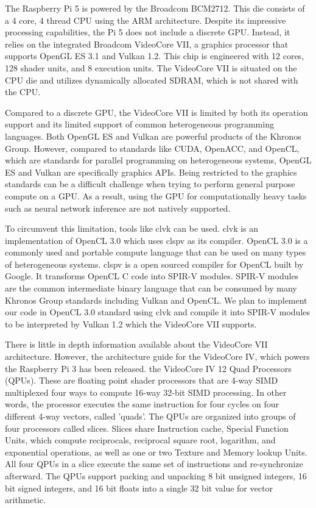 \documentclass[conference]{IEEEtran}
\begin{document}
 The Raspberry Pi 5 is powered by the Broadcom BCM2712. This die consists of a 
 4 core, 4 thread CPU using the ARM architecture. Despite its impressive processing 
 capabilities, the Pi 5 does not include a discrete GPU. Instead, it relies on the 
 integrated Broadcom VideoCore VII, a graphics processor that supports OpenGL 
 ES 3.1 and Vulkan 1.2. This chip is engineered with 12 cores, 128 shader units, 
 and 8 execution units. The VideoCore VII is situated on the CPU die and utilizes 
 dynamically allocated SDRAM, which is not shared with the CPU. 

 Compared to a discrete GPU, the VideoCore VII is limited by both its operation support and 
 its limited support of common heterogeneous programming languages. Both OpenGL ES and Vulkan are powerful
 products of the Khronos Group. However, compared to standards like CUDA, OpenACC, and OpenCL, which 
 are standards for parallel programming on heterogeneous systems, OpenGL ES and Vulkan are specifically 
 graphics APIs. Being restricted to the graphics standards can be a difficult challenge when trying to 
 perform general purpose compute on a GPU. As a result, using the GPU for computationally heavy tasks such as 
 neural network inference are not natively supported.

 To circumvent this limitation, tools like clvk can be used. clvk is an implementation of OpenCL 3.0 which uses 
 clspv as its compiler. OpenCL 3.0 is a commonly used and portable compute language that can be used on 
 many types of heterogeneous systems. clspv is a open sourced compiler for OpenCL built by Google. It 
 transforms OpenCL C code into SPIR-V modules. SPIR-V modules are the common intermediate binary language that 
 can be consumed by many Khronos Group standards including Vulkan and OpenCL. We plan to implement our code 
 in OpenCL 3.0 standard using clvk and compile it into SPIR-V modules to be interpreted by Vulkan 1.2 which the 
 VideoCore VII supports.

 There is little in depth information available about the VideoCore VII architecture. However, 
 the architecture guide for the VideoCore IV, which powers the Raspberry Pi 3 has been released\cite{broadcom2013videocore}.
 the VideoCore IV 12 Quad Processors (QPUs). These are floating point shader processors that 
 are 4-way SIMD multiplexed four ways to compute 16-way 32-bit SIMD processing. In other 
 words, the processor executes the same instruction for four cycles on four different 4-way vectors, 
 called 'quads'. The QPUs are organized into groups of four processors called slices. Slices share 
 Instruction cache, Special Function Units, which compute reciprocals, reciprocal square root, 
 logarithm, and exponential operations, as well as one or two Texture and Memory lookup Units.
 All four QPUs in a slice execute the same set of instructions and re-synchronize afterward.
 The QPUs support packing and unpacking 8 bit unsigned integers, 16 bit signed integers, and 16
 bit floats into a single 32 bit value for vector arithmetic.
\end{document}
